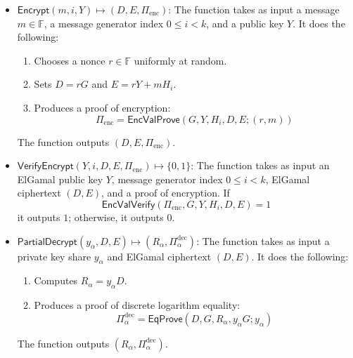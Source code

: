 \documentclass{llncs}
\newcommand{\F}{\mathbb{F}}
\newcommand{\func}[1]{\mathsf{#1}}
\begin{document}
\begin{itemize}
    \item $\func{Encrypt}(m, i, Y) \mapsto (D, E, \Pi_{\text{enc}})$: The function takes as input a message $m \in \F$, a message generator index $0 \leq i < k$, and a public key $Y$.
    It does the following:
    \begin{enumerate}
        \item Chooses a nonce $r \in \F$ uniformly at random.
        \item Sets $D = rG$ and $E = rY + mH_i$.
        \item Produces a proof of encryption: \[ \Pi_{\text{enc}} = \func{EncValProve}(G, Y, H_i, D, E ; (r, m)) \]
    \end{enumerate}
    The function outputs $(D, E, \Pi_{\text{enc}})$.
    
    \item $\func{VerifyEncrypt}(Y, i, D, E, \Pi_{\text{enc}}) \mapsto \{0, 1\}$: The function takes as input an ElGamal public key $Y$, message generator index $0 \leq i < k$, ElGamal ciphertext $(D, E)$, and a proof of encryption.
    If \[ \func{EncValVerify}(\Pi_{\text{enc}}, G, Y, H_i, D, E) = 1 \] it outputs $1$; otherwise, it outputs $0$.
    
    \item $\func{PartialDecrypt}(y_\alpha, D, E) \mapsto (R_\alpha, \Pi_\alpha^{\text{dec}})$: The function takes as input a private key share $y_\alpha$ and ElGamal ciphertext $(D, E)$.
    It does the following:
    \begin{enumerate}
        \item Computes $R_\alpha = y_\alpha D$.
        \item Produces a proof of discrete logarithm equality: \[ \Pi_\alpha^{\text{dec}} = \func{EqProve}(D, G, R_\alpha, y_\alpha G ; y_\alpha) \]
    \end{enumerate}
    The function outputs $(R_\alpha, \Pi_\alpha^{\text{dec}})$.
    

\end{itemize}
\end{document}
